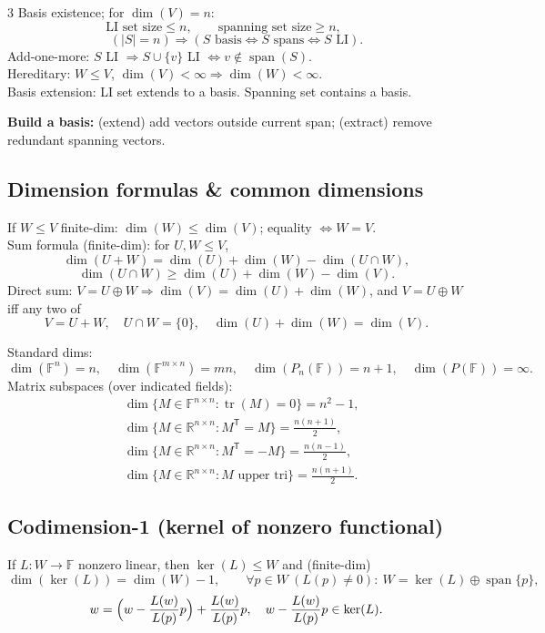 \documentclass[9pt]{article}
\newcommand{\R}{\mathbb{R}}
\newcommand{\F}{\mathbb{F}}
\newcommand{\Ker}{\operatorname{ker}}
\newcommand{\spann}{\operatorname{span}}
\newcommand{\tr}{\operatorname{tr}}
\begin{document}
\begin{multicols}{3}
Basis existence; for $\dim(V)=n$:
\[
\text{LI set size}\le n,\qquad \text{spanning set size}\ge n,\qquad
\]
\[
(|S|=n)\Rightarrow (S\text{ basis}\iff S\text{ spans}\iff S\text{ LI}).
\]
Add-one-more: $S$ LI $\Rightarrow S\cup\{v\}$ LI $\iff v\notin\spann(S)$.\\
Hereditary: $W\le V$, $\dim(V)<\infty\Rightarrow \dim(W)<\infty$.\\
Basis extension: LI set extends to a basis. Spanning set contains a basis.

\textbf{Build a basis:} (extend) add vectors outside current span; (extract) remove redundant spanning vectors.\\

\subsection*{Dimension formulas \& common dimensions}
If $W\le V$ finite-dim: $\dim(W)\le \dim(V)$; equality $\iff W=V$.\\
Sum formula (finite-dim): for $U,W\le V$,
\[
\dim(U+W)=\dim(U)+\dim(W)-\dim(U\cap W),
\]
\[
\dim(U\cap W)\ge \dim(U)+\dim(W)-\dim(V).
\]
Direct sum: $V=U\oplus W \Rightarrow \dim(V)=\dim(U)+\dim(W)$, and $V=U\oplus W$ iff any two of
\[
V=U+W,\quad U\cap W=\{0\},\quad \dim(U)+\dim(W)=\dim(V).
\]

Standard dims:
\[
\dim(\F^n)=n,\quad \dim(\F^{m\times n})=mn,\quad \dim(P_n(\F))=n+1,\quad \dim(P(\F))=\infty.
\]
Matrix subspaces (over indicated fields):
\begin{align*}
& \dim\{M\in\F^{n\times n}:\tr(M)=0\}=n^2-1,\\
& \dim\{M\in\R^{n\times n}:M^{\mathsf T}=M\}=\tfrac{n(n+1)}{2},\\
& \dim\{M\in\R^{n\times n}:M^{\mathsf T}=-M\}=\tfrac{n(n-1)}{2},\\
& \dim\{M\in\R^{n\times n}:M\text{ upper tri}\}=\tfrac{n(n+1)}{2}.
\end{align*}

\subsection*{Codimension-1 (kernel of nonzero functional)}
If $L:W\to\F$ nonzero linear, then $\Ker(L)\le W$ and (finite-dim)
\[
\dim(\Ker(L))=\dim(W)-1,\qquad
\forall p\in W\ (L(p)\neq 0):\ W=\Ker(L)\oplus\spann\{p\},
\]
\[
w=\Bigl(w-\frac{L(w)}{L(p)}p\Bigr)+\frac{L(w)}{L(p)}p,\quad
w-\frac{L(w)}{L(p)}p\in\Ker(L).
\]


\end{multicols}
\end{document}

